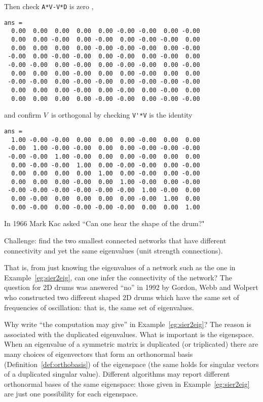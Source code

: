 \begin{example}
\begin{solution}
\begin{itemize}
\end{itemize}
Then check \verb|A*V-V*D| is zero \twodp,
{\small%
\begin{verbatim}
ans =
  0.00  0.00  0.00  0.00  0.00 -0.00 -0.00  0.00 -0.00
  0.00  0.00 -0.00  0.00 -0.00  0.00 -0.00 -0.00  0.00
  0.00  0.00  0.00  0.00 -0.00 -0.00 -0.00  0.00 -0.00
 -0.00  0.00 -0.00 -0.00  0.00 -0.00  0.00 -0.00  0.00
 -0.00 -0.00  0.00 -0.00  0.00 -0.00 -0.00  0.00 -0.00
  0.00  0.00  0.00 -0.00  0.00  0.00 -0.00  0.00  0.00
 -0.00 -0.00  0.00 -0.00 -0.00  0.00 -0.00 -0.00 -0.00
  0.00  0.00  0.00 -0.00  0.00 -0.00  0.00 -0.00  0.00
  0.00  0.00  0.00  0.00 -0.00 -0.00  0.00 -0.00 -0.00
\end{verbatim}
}
and confirm \(V\)~is orthogonal by checking \verb|V'*V| is the identity \twodp
{\small%
\begin{verbatim}
ans =
  1.00 -0.00 -0.00  0.00  0.00  0.00 -0.00  0.00  0.00
 -0.00  1.00 -0.00 -0.00  0.00  0.00 -0.00 -0.00 -0.00
 -0.00 -0.00  1.00 -0.00  0.00  0.00 -0.00  0.00  0.00
  0.00 -0.00 -0.00  1.00  0.00 -0.00 -0.00  0.00 -0.00
  0.00  0.00  0.00  0.00  1.00  0.00 -0.00  0.00 -0.00
  0.00  0.00  0.00 -0.00  0.00  1.00 -0.00  0.00 -0.00
 -0.00 -0.00 -0.00 -0.00 -0.00 -0.00  1.00 -0.00  0.00
  0.00 -0.00  0.00  0.00  0.00  0.00 -0.00  1.00  0.00
  0.00 -0.00  0.00 -0.00 -0.00 -0.00  0.00  0.00  1.00
\end{verbatim}
}
\end{solution}
\end{example}



In 1966 Mark Kac asked ``Can one hear the shape of the drum?"
\begin{aside}
Challenge: find the two smallest connected networks that have different connectivity and yet the same eigenvalues (unit strength connections).
\end{aside}
That is, from just knowing the eigenvalues of a network such as the one in Example~\ref{eg:sier2eig}, can one infer the connectivity of the network?
The question for 2D drums was answered ``no'' in 1992 by Gordon, Webb and Wolpert who constructed two different shaped 2D drums which have the same set of frequencies of oscillation: that is, the same set of eigenvalues.

Why write ``the computation may give'' in Example~\ref{eg:sier2eig}?  
The reason is associated with the duplicated eigenvalues.
What is important is the eigenspace.
When an eigenvalue of a symmetric matrix is duplicated (or triplicated) there are many choices of eigenvectors that form an orthonormal basis (Definition~\ref{def:orthobasis}) of the eigenspace (the same holds for singular vectors of a duplicated singular value).
Different algorithms may report different orthonormal bases of the same eigenspace: those given in  Example~\ref{eg:sier2eig} are just one possibility for each eigenspace.




